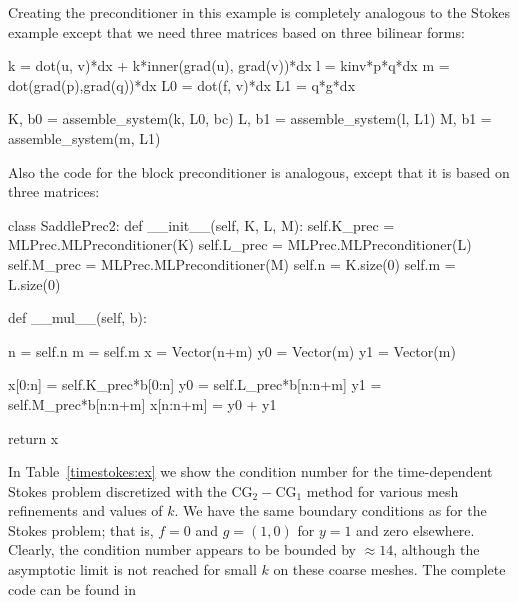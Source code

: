 Creating the preconditioner in this example is completely analogous to
the Stokes example except that we need three matrices based on three
bilinear forms:
\begin{python}
k = dot(u, v)*dx +  k*inner(grad(u), grad(v))*dx
l = kinv*p*q*dx
m = dot(grad(p),grad(q))*dx
L0 = dot(f, v)*dx
L1 = q*g*dx

K, b0 = assemble_system(k, L0, bc)
L, b1 = assemble_system(l, L1)
M, b1 = assemble_system(m, L1)
\end{python}
Also the code for the block preconditioner is analogous, except that
it is based on three matrices:
\begin{python}
class SaddlePrec2:
    def __init__(self, K, L, M):
        self.K_prec = MLPrec.MLPreconditioner(K)
        self.L_prec = MLPrec.MLPreconditioner(L)
        self.M_prec = MLPrec.MLPreconditioner(M)
        self.n = K.size(0)
        self.m = L.size(0)

    def __mul__(self, b):

        n = self.n
        m = self.m
        x = Vector(n+m)
        y0 = Vector(m)
        y1 = Vector(m)

        x[0:n]    = self.K_prec*b[0:n]
        y0        = self.L_prec*b[n:n+m]
        y1        = self.M_prec*b[n:n+m]
        x[n:n+m]   = y0 + y1

        return x
\end{python}
In Table~\ref{timestokes:ex} we show the condition number for the
time-dependent Stokes problem discretized with the
$\mathrm{CG}_2-\mathrm{CG}_1$ method for various mesh refinements and
values of $k$. We have the same boundary conditions as for the Stokes
problem; that is, $f=0$ and $g = (1,0)$ for $y=1$ and zero elsewhere.
Clearly, the condition number appears to be bounded by $\approx 14$,
although the asymptotic limit is not reached for small $k$ on these
coarse meshes.  The complete code can be found in 

